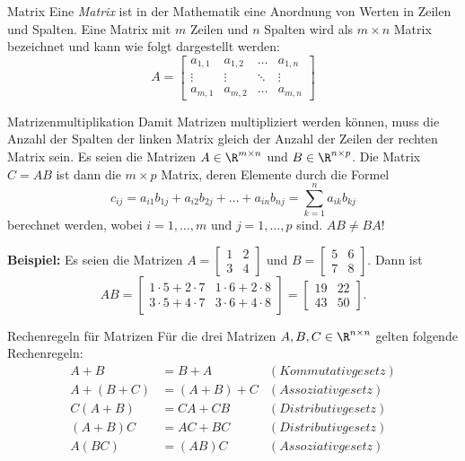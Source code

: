 \begin{definition}{Matrix}
    Eine \emph{Matrix} ist in der Mathematik eine Anordnung von Werten in Zeilen und Spalten.
    Eine Matrix mit $m$ Zeilen und $n$ Spalten wird als $m \times n$ Matrix bezeichnet und kann wie folgt dargestellt werden:
    \[A = \begin{bmatrix}
              a_{1,1} & a_{1,2} & \dots  & a_{1,n} \\
              \vdots  & \vdots  & \ddots & \vdots  \\
              a_{m,1} & a_{m,2} & \dots  & a_{m,n}
    \end{bmatrix}\]
\end{definition}

\begin{definition}{Matrizenmultiplikation}
    Damit Matrizen multipliziert werden können, muss die Anzahl der Spalten der linken Matrix gleich der Anzahl der Zeilen der rechten Matrix sein.
    Es seien die Matrizen $A \in \R^{m \times n}$ und $B \in \R^{n \times p}$.
    Die Matrix $C = AB$ ist dann die $m \times p$ Matrix, deren Elemente durch die Formel \[c_{ij} = a_{i1}b_{1j} + a_{i2}b_{2j} + \dots + a_{in}b_{nj} = \sum_{k=1}^{n} a_{ik}b_{kj}\] berechnet werden, wobei $i = 1,\dots,m$ und $j = 1,\dots,p$ sind. $AB \neq BA$!
\end{definition}

\textbf{Beispiel:} Es seien die Matrizen
$A =
\begin{bmatrix}
    1 & 2 \\
    3 & 4
\end{bmatrix}$ und $B =
\begin{bmatrix}
    5 & 6 \\
    7 & 8
\end{bmatrix}$.
Dann ist \[AB =
\begin{bmatrix}
    1 \cdot 5 + 2 \cdot 7 & 1 \cdot 6 + 2 \cdot 8 \\
    3 \cdot 5 + 4 \cdot 7 & 3 \cdot 6 + 4 \cdot 8
\end{bmatrix} =
\begin{bmatrix}
    19 & 22 \\
    43 & 50
\end{bmatrix}.\]

\begin{subbox}{Rechenregeln für Matrizen}
    Für die drei Matrizen $A,B,C \in \R^{n \times n}$ gelten folgende Rechenregeln:
    \begin{align*}
        A + B &= B + A &(Kommutativgesetz) \\
        A + (B + C) &= (A + B) + C &(Assoziativgesetz) \\
        C(A + B) &= CA + CB &(Distributivgesetz) \\
        (A + B)C &= AC + BC &(Distributivgesetz) \\
        A(BC) &= (AB)C &(Assoziativgesetz)
    \end{align*}
\end{subbox}

